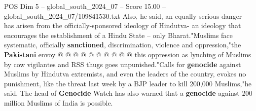 \begin{textsample}{POS Dim 5 – global\_south\_2024\_07 – Score 15.00 – global\_south\_2024\_07/109841530.txt}
Also, he said, an equally serious danger has arisen from the officially-sponsored ideology of Hindutva- an ideology that encourages the establishment of a Hindu State -- only Bharat."Muslims face systematic, officially \textbf{sanctioned}, discrimination, violence and oppression,"the \textbf{Pakistani} envoy @ @ @ @ @ @ @ @ @ @ this oppression as lynching of Muslims by cow vigilantes and RSS thugs goes unpunished."Calls for \textbf{genocide} against Muslims by Hindutva extremists, and even the leaders of the country, evokes no punishment, like the threat last week by a BJP leader to kill 200,000 Muslims,"he said.
The head of \textbf{Genocide} Watch has also warned that a \textbf{genocide} against 200 million Muslims of India is possible.

\end{textsample}
